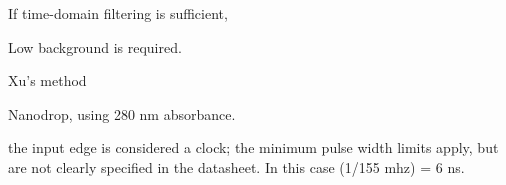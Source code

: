 


If time-domain filtering is sufficient, 

Low background is required.

Xu's method \cite{Quantification2020}



Nanodrop, using 280 nm absorbance.


the input edge is considered a clock; the minimum pulse width limits apply, but are not clearly specified in the datasheet. In this case (1/155 mhz) = 6 ns.

